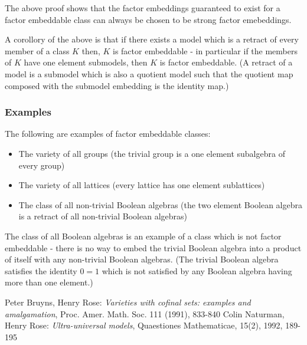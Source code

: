\documentclass[12pt]{article}
\begin{document}
The above proof shows that the factor embeddings guaranteed to exist for a factor embeddable class can always be chosen to be strong factor emebeddings. \cite{UM}

A corollory of the above is that if there exists a model which is a retract of every member of a class $K$ then, $K$ is factor embeddable - in particular if the members of $K$ have one element submodels, then $K$ is factor embeddable. \cite{UM} (A retract of a model is a submodel which is also a quotient model such that the quotient map composed with the submodel embedding is the identity map.)

\subsubsection{Examples}
The following are examples of factor embeddable classes:

\begin{itemize}
\item The variety of all groups (the trivial group is a one element subalgebra of every group)
\item The variety of all lattices (every lattice has one element sublattices)
\item The class of all non-trivial Boolean algebras (the two element Boolean algebra is a retract of all non-trivial Boolean algebras)
\end{itemize}

The class of all Boolean algebras is an example of a class which is not factor embeddable - there is no way to embed the trivial Boolean algebra into a product of itself with any non-trivial Boolean algebras. (The trivial Boolean algebra satisfies the identity $0=1$ which is not satisfied by any Boolean algebra having more than one element.)
 
\begin{thebibliography}{1}
 Peter Bruyns, Henry Rose: \emph{Varieties with cofinal sets: examples and amalgamation}, Proc. Amer. Math. Soc. 111 (1991), 833-840
 Colin Naturman, Henry Rose: \emph{Ultra-universal models}, Quaestiones Mathematicae, 15(2), 1992, 189-195
\end{thebibliography}

\end{document}
